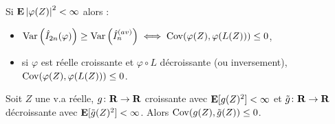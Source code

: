 	\begin{pop}
		Si $\mathbf{E} \left\lvert\varphi(Z)\right\rvert^2 < \infty$ alors :
		\begin{itemize}
			\item[\textbullet] $\operatorname{Var} \left( \hat{I}_{2n}(\varphi) \right) \geq \operatorname{Var} \left( \hat{I}^{(av)}_n \right) \iff \operatorname{Cov}(\varphi(Z), \varphi(L(Z))) \leq 0$,
			\item[\textbullet] si $\varphi$ est réelle croissante et $\varphi \circ L$ décroissante (ou inversement), $\operatorname{Cov}(\varphi(Z), \varphi(L(Z))) \leq 0$.
		\end{itemize}
	\end{pop}
	
	\begin{lem}
		Soit $Z$ une v.a réelle, $g \colon \mathbf{R} \to \mathbf{R}$ croissante avec $\mathbf{E}[g(Z)^2] < \infty$ et $\tilde{g} \colon \mathbf{R} \to \mathbf{R}$ décroissante avec $\mathbf{E}[\tilde{g}(Z)^2] < \infty$.
		Alors $\operatorname{Cov}(g(Z),\tilde{g}(Z)) \leq 0$.
	\end{lem}